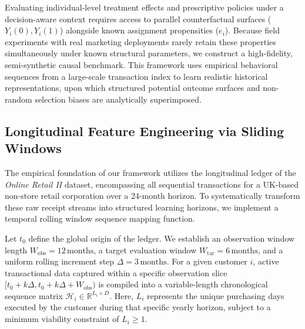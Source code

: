 \documentclass[10pt, conference]{IEEEtran}
\begin{document}
Evaluating individual-level treatment effects and prescriptive policies under a decision-aware context requires access to parallel counterfactual surfaces ($Y_i(0), Y_i(1)$) alongside known assignment propensities ($e_i$). Because field experiments with real marketing deployments rarely retain these properties simultaneously under known structural parameters, we construct a high-fidelity, semi-synthetic causal benchmark. This framework uses empirical behavioral sequences from a large-scale transaction index to learn realistic historical representations, upon which structured potential outcome surfaces and non-random selection biases are analytically superimposed.

\subsection{Longitudinal Feature Engineering via Sliding Windows}
The empirical foundation of our framework utilizes the longitudinal ledger of the \textit{Online Retail II} dataset, encompassing all sequential transactions for a UK-based non-store retail corporation over a 24-month horizon. To systematically transform these raw receipt streams into structured learning horizons, we implement a temporal rolling window sequence mapping function.

Let $t_0$ define the global origin of the ledger. We establish an observation window length $W_{\text{obs}} = 12\,\text{months}$, a target evaluation window $W_{\text{tar}} = 6\,\text{months}$, and a uniform rolling increment step $\Delta = 3\,\text{months}$. For a given customer $i$, active transactional data captured within a specific observation slice $[t_0 + k\Delta, t_0 + k\Delta + W_{\text{obs}})$ is compiled into a variable-length chronological sequence matrix $\mathbf{\mathcal{H}}_i \in \mathbb{R}^{L_i \times D}$. Here, $L_i$ represents the unique purchasing days executed by the customer during that specific yearly horizon, subject to a minimum viability constraint of $L_i \ge 1$. 
\end{document}
